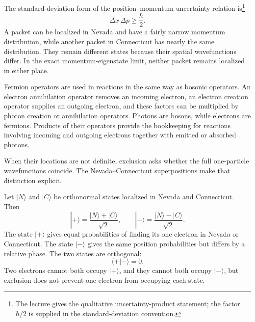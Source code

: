The standard-deviation form of the position--momentum uncertainty relation is\footnote{The lecture gives the qualitative uncertainty-product statement; the factor \(\hbar/2\) is supplied in the standard-deviation convention.}
\begin{equation}
\Delta x\,\Delta p\geq\frac{\hbar}{2}.
\end{equation}
A packet can be localized in Nevada and have a fairly narrow momentum distribution, while another packet in Connecticut has nearly the same distribution. They remain different states because their spatial wavefunctions differ. In the exact momentum-eigenstate limit, neither packet remains localized in either place.

Fermion operators are used in reactions in the same way as bosonic operators. An electron annihilation operator removes an incoming electron, an electron creation operator supplies an outgoing electron, and these factors can be multiplied by photon creation or annihilation operators. Photons are bosons, while electrons are fermions. Products of their operators provide the bookkeeping for reactions involving incoming and outgoing electrons together with emitted or absorbed photons.

\begin{classroomqa}
\end{classroomqa}


When their locations are not definite, exclusion asks whether the full one-particle wavefunctions coincide. The Nevada--Connecticut superpositions make that distinction explicit.

Let \(|N\rangle\) and \(|C\rangle\) be orthonormal states localized in Nevada and Connecticut. Then
\begin{equation}
|+\rangle=\frac{|N\rangle+|C\rangle}{\sqrt2},
\qquad
|-\rangle=\frac{|N\rangle-|C\rangle}{\sqrt2}.
\end{equation}
The state \(|+\rangle\) gives equal probabilities of finding its one electron in Nevada or Connecticut. The state \(|-\rangle\) gives the same position probabilities but differs by a relative phase. The two states are orthogonal:
\begin{equation}
\langle+|-\rangle=0.
\end{equation}
Two electrons cannot both occupy \(|+\rangle\), and they cannot both occupy \(|-\rangle\), but exclusion does not prevent one electron from occupying each state.

